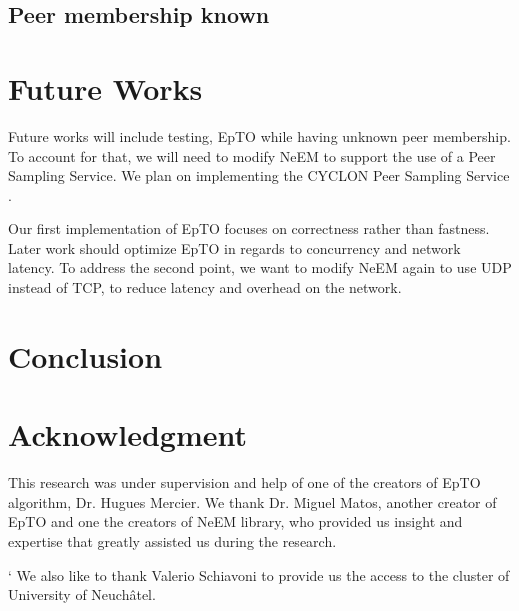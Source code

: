 \documentclass[10pt,conference,a4paper]{IEEEtran}
\begin{document}
\subsection{Peer membership known}

\section{Future Works}
Future works will include testing, EpTO while having unknown peer membership. To account for that, we will need to modify NeEM to support the use of a Peer Sampling Service. We plan on implementing the CYCLON Peer Sampling Service \autocite{Voulgaris2005}.

Our first implementation of EpTO focuses on correctness rather than fastness. Later work should optimize EpTO in regards to concurrency and network latency. To address the second point, we want to modify NeEM again to use UDP instead of TCP, to reduce latency and overhead on the network.
\section{Conclusion}




\section*{Acknowledgment}
This research was under supervision and help of one of the creators of EpTO algorithm, Dr. Hugues Mercier. We 	thank Dr. Miguel Matos, another creator of EpTO and one the creators of NeEM library, who provided us insight and expertise that greatly assisted us during the research.
\par`
We also like to thank Valerio Schiavoni to provide us the access to the cluster of University of Neuchâtel.




\begin{otherlanguage}{australian}
\printbibliography
\end{otherlanguage}

\end{document}
